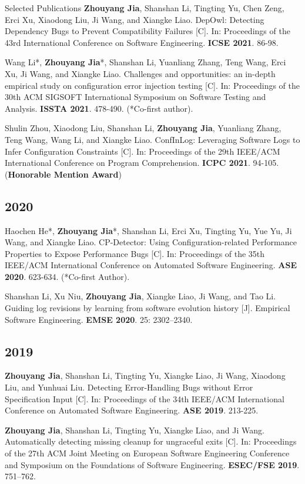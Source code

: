 \documentclass{resume}
\begin{document}
\begin{rSection}{Selected Publications}
\textbf{Zhouyang Jia}, Shanshan Li, Tingting Yu, Chen Zeng, Erci Xu, Xiaodong Liu, Ji Wang, and Xiangke Liao. DepOwl: Detecting Dependency Bugs to Prevent Compatibility Failures [C]. In: Proceedings of the 43rd International Conference on Software Engineering. \textbf{ICSE 2021}. 86-98.

Wang Li*, \textbf{Zhouyang Jia}*, Shanshan Li, Yuanliang Zhang, Teng Wang, Erci Xu, Ji Wang, and Xiangke Liao. Challenges and opportunities: an in-depth empirical study on configuration error injection testing [C]. In: Proceedings of the 30th ACM SIGSOFT International Symposium on Software Testing and Analysis. \textbf{ISSTA 2021}. 478-490. (*Co-first author).

Shulin Zhou, Xiaodong Liu, Shanshan Li, \textbf{Zhouyang Jia}, Yuanliang Zhang, Teng Wang, Wang Li, and Xiangke Liao. ConfInLog: Leveraging Software Logs to Infer Configuration Constraints [C]. In: Proceedings of the 29th IEEE/ACM International Conference on Program Comprehension. \textbf{ICPC 2021}. 94-105. (\textbf{Honorable Mention Award})

\subsection*{2020}

Haochen He*, \textbf{Zhouyang Jia}*, Shanshan Li, Erci Xu, Tingting Yu, Yue Yu, Ji Wang, and Xiangke Liao. CP-Detector: Using Configuration-related Performance Properties to Expose Performance Bugs [C]. In: Proceedings of the 35th IEEE/ACM International Conference on Automated Software Engineering. \textbf{ASE 2020}. 623-634. (*Co-first Author).

Shanshan Li, Xu Niu, \textbf{Zhouyang Jia}, Xiangke Liao, Ji Wang, and Tao Li. Guiding log revisions by learning from software evolution history [J]. Empirical Software Engineering. \textbf{EMSE 2020}. 25: 2302–2340.

\subsection*{2019}

\textbf{Zhouyang Jia}, Shanshan Li, Tingting Yu, Xiangke Liao, Ji Wang, Xiaodong Liu, and Yunhuai Liu. Detecting Error-Handling Bugs without Error Specification Input [C]. In: Proceedings of the 34th IEEE/ACM International Conference on Automated Software Engineering. \textbf{ASE 2019}. 213-225.

\textbf{Zhouyang Jia}, Shanshan Li, Tingting Yu, Xiangke Liao, and Ji Wang. Automatically detecting missing cleanup for ungraceful exits [C]. In: Proceedings of the 27th ACM Joint Meeting on European Software Engineering Conference and Symposium on the Foundations of Software Engineering. \textbf{ESEC/FSE 2019}. 751–762. 


\end{rSection}
\end{document}
